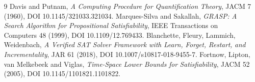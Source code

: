 \documentclass[11pt]{article}
\begin{document}
\begin{thebibliography}{9}
 Davis and Putnam, \emph{A Computing Procedure for Quantification Theory}, JACM 7 (1960), DOI 10.1145/321033.321034.
 Marques-Silva and Sakallah, \emph{GRASP: A Search Algorithm for Propositional Satisfiability}, IEEE Transactions on Computers 48 (1999), DOI 10.1109/12.769433.
 Blanchette, Fleury, Lammich, Weidenbach, \emph{A Verified SAT Solver Framework with Learn, Forget, Restart, and Incrementality}, JAR 61 (2018), DOI 10.1007/s10817-018-9455-7.
 Fortnow, Lipton, van Melkebeek and Viglas, \emph{Time-Space Lower Bounds for Satisfiability}, JACM 52 (2005), DOI 10.1145/1101821.1101822.
\end{thebibliography}
\end{document}
